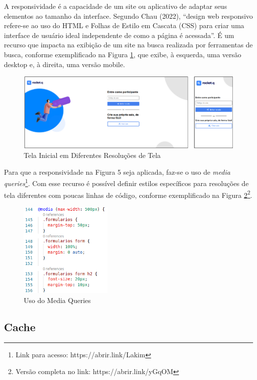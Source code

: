 \documentclass[12pt]{article}
\begin{document}
A responsividade é a capacidade de um site ou aplicativo de adaptar seus elementos ao tamanho da interface. Segundo Chau (2022), “design web responsivo refere-se ao uso do HTML e Folhas de Estilo em Cascata (CSS) para criar uma interface de usuário ideal independente de como a página é  acessada”. É um recurso que impacta na exibição de um site na busca realizada por ferramentas de busca, conforme exemplificado na Figura \ref{fig:responsividade}, que exibe, à esquerda, uma versão desktop e, à direita, uma versão mobile.

\begin{figure}[ht!]
\centering
\includegraphics[width=.9\textwidth]{imagens/responsividade.jpg}
\caption{Tela Inicial em Diferentes Resoluções de Tela}
\label{fig:responsividade}
\end{figure}

Para que a responsividade na Figura 5 seja aplicada, faz-se o uso de \textit{media queries}\footnote{Link para acesso: https://abrir.link/Lakim}. Com esse recurso é possível definir estilos específicos para resoluções de tela diferentes com poucas linhas de código, conforme exemplificado na Figura \ref{fig:media}\footnote{Versão completa no link: https://abrir.link/yGqOM}.

\begin{figure}[ht!]
\centering
\includegraphics[width=0.4\textwidth]{imagens/media.jpg}
\caption{Uso do Media Queries}
\label{fig:media}
\end{figure}


\subsection{Cache} \label{sec:cache}
\end{document}
